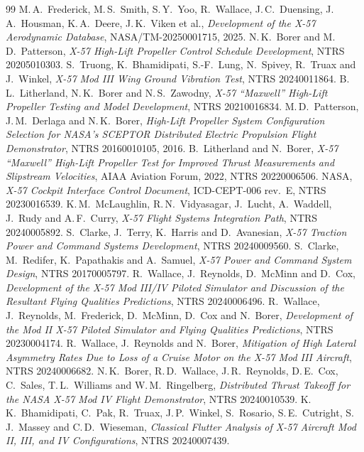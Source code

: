 \documentclass[10pt,a4paper,twocolumn]{article}
\begin{document}
\begin{thebibliography}{99}\small
{} M.\,A.\ Frederick, M.\,S.\ Smith, S.\,Y.\ Yoo, R.\ Wallace, J.\,C.\ Duensing, J.\,A.\ Housman, K.\,A.\ Deere, J.\,K.\ Viken et al., \emph{Development of the X-57 Aerodynamic Database}, NASA/TM-20250001715, 2025.
 N.\,K.\ Borer and M.\,D.\ Patterson, \emph{X-57 High-Lift Propeller Control Schedule Development}, NTRS 20205010303.
 S.\ Truong, K.\ Bhamidipati, S.-F.\ Lung, N.\ Spivey, R.\ Truax and J.\ Winkel, \emph{X-57 Mod III Wing Ground Vibration Test}, NTRS 20240011864.
 B.\,L.\ Litherland, N.\,K.\ Borer and N.\,S.\ Zawodny, \emph{X-57 ``Maxwell'' High-Lift Propeller Testing and Model Development}, NTRS 20210016834.
 M.\,D.\ Patterson, J.\,M.\ Derlaga and N.\,K.\ Borer, \emph{High-Lift Propeller System Configuration Selection for NASA's SCEPTOR Distributed Electric Propulsion Flight Demonstrator}, NTRS 20160010105, 2016.
 B.\ Litherland and N.\ Borer, \emph{X-57 ``Maxwell'' High-Lift Propeller Test for Improved Thrust Measurements and Slipstream Velocities}, AIAA Aviation Forum, 2022, NTRS 20220006506.
 NASA, \emph{X-57 Cockpit Interface Control Document}, ICD-CEPT-006 rev.~E, NTRS 20230016539.
 K.\,M.\ McLaughlin, R.\,N.\ Vidyasagar, J.\ Lucht, A.\ Waddell, J.\ Rudy and A.\,F.\ Curry, \emph{X-57 Flight Systems Integration Path}, NTRS 20240005892.
 S.\ Clarke, J.\ Terry, K.\ Harris and D.\ Avanesian, \emph{X-57 Traction Power and Command Systems Development}, NTRS 20240009560.
 S.\ Clarke, M.\ Redifer, K.\ Papathakis and A.\ Samuel, \emph{X-57 Power and Command System Design}, NTRS 20170005797.
 R.\ Wallace, J.\ Reynolds, D.\ McMinn and D.\ Cox, \emph{Development of the X-57 Mod III/IV Piloted Simulator and Discussion of the Resultant Flying Qualities Predictions}, NTRS 20240006496.
 R.\ Wallace, J.\ Reynolds, M.\ Frederick, D.\ McMinn, D.\ Cox and N.\ Borer, \emph{Development of the Mod II X-57 Piloted Simulator and Flying Qualities Predictions}, NTRS 20230004174.
 R.\ Wallace, J.\ Reynolds and N.\ Borer, \emph{Mitigation of High Lateral Asymmetry Rates Due to Loss of a Cruise Motor on the X-57 Mod III Aircraft}, NTRS 20240006682.
 N.\,K.\ Borer, R.\,D.\ Wallace, J.\,R.\ Reynolds, D.\,E.\ Cox, C.\ Sales, T.\,L.\ Williams and W.\,M.\ Ringelberg, \emph{Distributed Thrust Takeoff for the NASA X-57 Mod IV Flight Demonstrator}, NTRS 20240010539.
 K.\,K.\ Bhamidipati, C.\ Pak, R.\ Truax, J.\,P.\ Winkel, S.\ Rosario, S.\,E.\ Cutright, S.\,J.\ Massey and C.\,D.\ Wieseman, \emph{Classical Flutter Analysis of X-57 Aircraft Mod II, III, and IV Configurations}, NTRS 20240007439.

\end{thebibliography}
\end{document}
